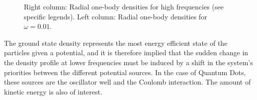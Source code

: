 \begin{figure}
\begin{center}
\begin{tabular}{lr}
  \end{tabular}
  \caption{Right column: Radial one-body densities for high frequencies (see specific legends). Left column: Radial one-body densities for $\omega=0.01$.}
  \label{fig:OBD_collapsed_w001}
 \end{center}
\end{figure}
\setlength{\tabcolsep}{6pt}
\captionsetup[subfloat]{labelformat=parens}

% 
% 


The ground state density represents the most energy efficient state of the particles given a potential, and it is therefore implied that the sudden change in the density profile at lower frequencies must be induced by a shift in the system's priorities between the different potential sources. In the case of Quantum Dots, these sources are the oscillator well and the Coulomb interaction. The amount of kinetic energy is also of interest.

